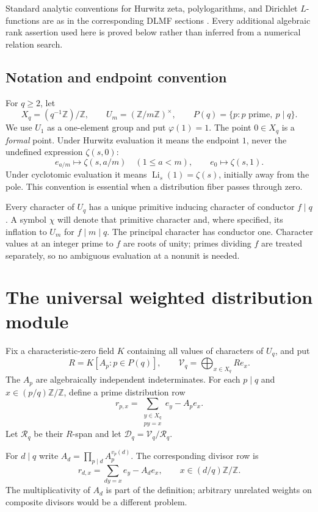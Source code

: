 \documentclass[11pt]{article}
\numberwithin{equation}{section}
\theoremstyle{definition}
\theoremstyle{remark}
\DeclareMathOperator{\Li}{Li}
\newcommand{\Z}{\mathbb Z}
\newcommand{\V}{\mathcal V}
\newcommand{\D}{\mathcal D}
\begin{document}
Standard analytic conventions for Hurwitz zeta, polylogarithms, and
Dirichlet $L$-functions are as in the corresponding DLMF sections
\cite{dlmf-hurwitz,dlmf-polylog,dlmf-dirichlet}. Every additional algebraic
rank assertion used here is proved below rather than inferred from a
numerical relation search.

\subsection{Notation and endpoint convention}
For $q\ge2$, let
\[
 X_q=(q^{-1}\Z)/\Z,\qquad U_m=(\Z/m\Z)^\times,
 \qquad P(q)=\{p:p\text{ prime},\ p\mid q\}.
\]
We use $U_1$ as a one-element group and put $\varphi(1)=1$.
The point $0\in X_q$ is a \emph{formal} point. Under Hurwitz evaluation it
means the endpoint $1$, never the undefined expression $\zeta(s,0)$:
\[
 e_{a/m}\longmapsto\zeta(s,a/m)\quad(1\le a<m),
 \qquad e_0\longmapsto\zeta(s,1).
\]
Under cyclotomic evaluation it means $\Li_s(1)=\zeta(s)$, initially
away from the pole. This convention is essential when a distribution
fiber passes through zero.

Every character of $U_q$ has a unique primitive inducing character of
conductor $f\mid q$. A symbol $\chi$ will denote that primitive character
and, where specified, its inflation to $U_m$ for $f\mid m\mid q$.
The principal character has conductor one. Character values at an
integer prime to $f$ are roots of unity; primes dividing $f$ are treated
separately, so no ambiguous evaluation at a nonunit is needed.

\section{The universal weighted distribution module}\label{sec:universal}

Fix a characteristic-zero field $K$ containing all values of characters
of $U_q$, and put
\[
 R=K[A_p:p\in P(q)],\qquad
 \V_q=\bigoplus_{x\in X_q}R e_x.
\]
The $A_p$ are algebraically independent indeterminates. For each
$p\mid q$ and $x\in (p/q)\Z/\Z$, define a prime distribution row
\begin{equation}\label{eq:prime-row}
 r_{p,x}=\sum_{\substack{y\in X_q\\py=x}}e_y-A_p e_x.
\end{equation}
Let $\mathcal R_q$ be their $R$-span and let
$\D_q=\V_q/\mathcal R_q$.

For $d\mid q$ write $A_d=\prod_{p\mid d}A_p^{v_p(d)}$.
The corresponding divisor row is
\begin{equation}\label{eq:divisor-row}
 r_{d,x}=\sum_{dy=x}e_y-A_d e_x,
 \qquad x\in(d/q)\Z/\Z.
\end{equation}
The multiplicativity of $A_d$ is part of the definition; arbitrary
unrelated weights on composite divisors would be a different problem.
\end{document}
